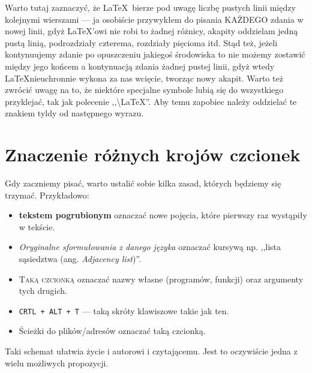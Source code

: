 Warto tutaj zaznaczyć, że \LaTeX~bierze pod uwagę liczbę pustych linii między kolejnymi wierszami --- ja osobiście przywykłem do pisania KAŻDEGO zdania w nowej linii, gdyż \LaTeX'owi nie robi to żadnej różnicy, akapity oddzielam jedną pustą linią, podrozdziały czterema, rozdziały pięcioma itd.
Stąd też, jeżeli kontynuujemy zdanie po opuszczeniu jakiegoś środowiska to nie możemy zostawić między jego końcem a kontynuacją zdania żadnej pustej linii, gdyż wtedy \LaTeX nieuchronnie wykona za nas wcięcie, tworząc nowy akapit.
Warto też zwrócić uwagę na to, że niektóre specjalne symbole lubią się do wszystkiego przyklejać, tak jak polecenie ,,\textbackslash LaTeX''.
Aby temu zapobiec należy oddzielać te znakiem tyldy od następnego wyrazu.




\section{Znaczenie różnych krojów czcionek}




Gdy zaczniemy pisać, warto ustalić sobie kilka zasad, których będziemy się trzymać.
Przykładowo:

\begin{itemize}
	\item \textbf{tekstem pogrubionym} oznaczać nowe pojęcia, które pierwszy raz wystąpiły w tekście.
	\item \textit{Oryginalne sformułowania z danego języka} oznaczać kursywą np. ,,lista sąsiedztwa (ang. \textit{Adjacency list})''.
	\item \textsc{Taką czcionką} oznaczać nazwy własne (programów, funkcji) oraz argumenty tych drugich.
	\item  \texttt{CRTL + ALT + T} --- taką skróty klawiszowe takie jak ten.
	\item \textsf{Ścieżki do plików/adresów} oznaczać taką czcionką.
\end{itemize}

Taki schemat ułatwia życie i autorowi i czytającemu.
Jest to oczywiście jedna z wielu możliwych propozycji.